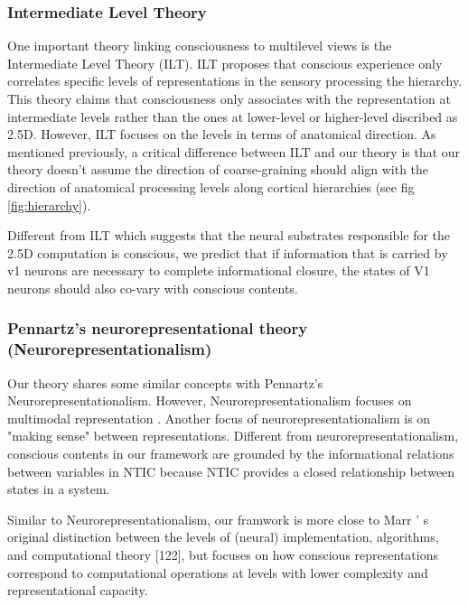 \documentclass[utf8]{article}
\begin{document}
			\subsubsection{Intermediate Level Theory} \label{IntermediateLevelTheory}
                One important theory linking consciousness to multilevel views is the Intermediate Level Theory (ILT). ILT proposes that conscious experience only correlates specific levels of representations in the sensory processing the hierarchy. This theory claims that consciousness only associates with the representation at intermediate levels rather than the ones at lower-level or higher-level discribed as 2.5D. However, ILT focuses on the levels in terms of anatomical direction. As mentioned previously, a critical difference between ILT and our theory is that our theory doesn't assume the direction of coarse-graining should align with the direction of anatomical processing levels along cortical hierarchies (see fig \ref{fig:hierarchy}).
                
                Different from ILT which suggests that the neural substrates responsible for the 2.5D computation is conscious, we predict that if information that is carried by v1 neurons are necessary to complete informational closure, the states of V1 neurons should also co-vary with conscious contents. 
				
			\subsubsection{Pennartz's neurorepresentational theory (Neurorepresentationalism)}
			    Our theory shares some similar concepts with Pennartz's Neurorepresentationalism. However, Neurorepresentationalism focuses on multimodal representation \cite{pennartz2018consciousness,pennartz2015brain}. Another focus of neurorepresentationalism is on "making sense" between representations. Different from neurorepresentationalism, conscious contents in our framework are grounded by the informational relations between variables in NTIC because NTIC provides a closed relationship between states in a system. 
			    
			    Similar to Neurorepresentationalism, our framwork is more close to Marr ’ s original distinction between the levels of (neural) implementation, algorithms, and computational theory [122], but focuses on how conscious representations correspond to computational operations at levels with lower complexity and representational capacity.\cite{pennartz2018consciousness,pennartz2015brain}
			    
\end{document}
